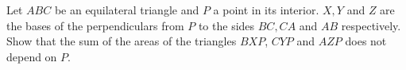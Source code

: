 Let $ABC$ be an equilateral triangle and $P$ a point in its interior.
$X, Y$ and $Z$ are the bases of the perpendiculars from $P$ to the
sides $BC, CA$ and $AB$ respectively.
Show that the sum of the areas of the triangles $BXP$, $CYP$ and $AZP$ does not depend on $P$.